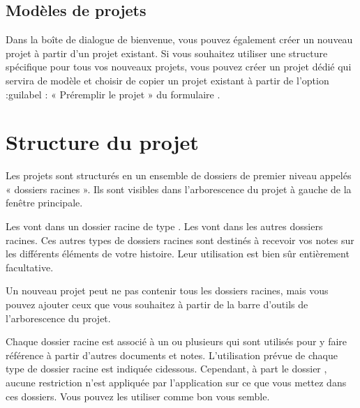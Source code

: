\documentclass[a4paper,11pt,french]{sphinxmanual}
\begin{document}
\subsection{Modèles de projets}
\label{\detokenize{project_overview:template-projects}}
\sphinxAtStartPar
Dans la boîte de dialogue de bienvenue, vous pouvez également créer un nouveau projet à partir d’un projet existant. Si vous souhaitez utiliser une structure spécifique pour tous vos nouveaux projets, vous pouvez créer un projet dédié qui servira de modèle et choisir de copier un projet existant à partir de l’option :guilabel : « Pré\sphinxhyphen{}remplir le projet » du formulaire .


\section{Structure du projet}
\label{\detokenize{project_overview:project-structure}}\label{\detokenize{project_overview:a-proj-roots}}
\sphinxAtStartPar
Les projets sont structurés en un ensemble de dossiers de premier niveau appelés « dossiers racines ». Ils sont visibles dans l’arborescence du projet à gauche de la fenêtre principale.

\sphinxAtStartPar
Les {\hyperref[\detokenize{int_glossary:term-Novel-Documents}]{}} vont dans un dossier racine de type . Les {\hyperref[\detokenize{int_glossary:term-Project-Notes}]{}} vont dans les autres dossiers racines. Ces autres types de dossiers racines sont destinés à recevoir vos notes sur les différents éléments de votre histoire. Leur utilisation est bien sûr entièrement facultative.

\sphinxAtStartPar
Un nouveau projet peut ne pas contenir tous les dossiers racines, mais vous pouvez ajouter ceux que vous souhaitez à partir de la barre d’outils de l’arborescence du projet.

\sphinxAtStartPar
Chaque dossier racine est associé à un ou plusieurs {\hyperref[\detokenize{int_glossary:term-Reference}]{}} {\hyperref[\detokenize{int_glossary:term-Keyword}]{}} qui sont utilisés pour y faire référence à partir d’autres documents et notes. L’utilisation prévue de chaque type de dossier racine est indiquée ci\sphinxhyphen{}dessous. Cependant, à part le dossier , aucune restriction n’est appliquée par l’application sur ce que vous mettez dans ces dossiers. Vous pouvez les utiliser comme bon vous semble.
\end{document}
